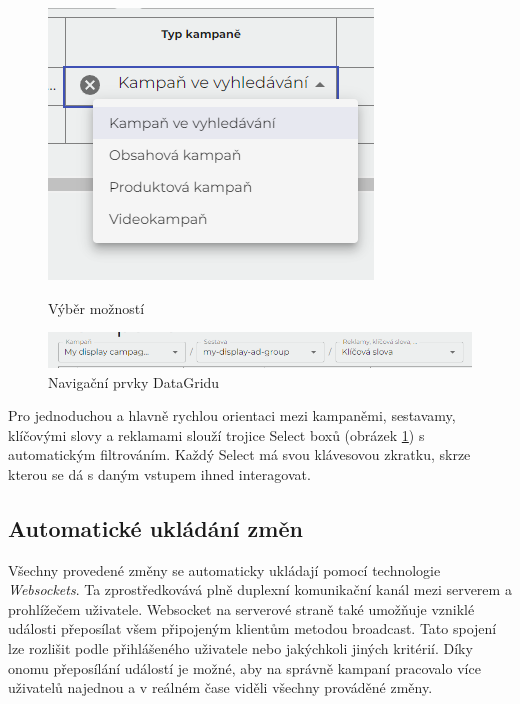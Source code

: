 \begin{figure}
    \begin{minipage}{.5\textwidth}
        \centering
        \includegraphics[width=.7\textwidth]{Figures/ui/cell-choices.png}
        \caption{Výběr možností}        
        \label{fig:cell-choices}
    \end{minipage}
    \begin{minipage}{.5\textwidth}
        \centering
        \includegraphics[width=1\textwidth]{Figures/ui/datagrid-controls.png}
        \caption{Navigační prvky DataGridu}        
        \label{fig:datagrid-controls}
    \end{minipage}
\end{figure}

Pro jednoduchou a hlavně rychlou orientaci mezi kampaněmi, sestavamy, klíčovými slovy a reklamami slouží trojice Select boxů (obrázek \ref{fig:datagrid-controls}) s automatickým filtrováním.
Každý Select má svou klávesovou zkratku, skrze kterou se dá s daným vstupem ihned interagovat. 



\subsection{Automatické ukládání změn}
Všechny provedené změny se automaticky ukládají pomocí technologie \emph{Websockets}. Ta zprostředkovává plně duplexní komunikační kanál mezi serverem a prohlížečem uživatele.
Websocket na serverové straně také umožňuje vzniklé události přeposílat všem připojeným klientům metodou broadcast. Tato spojení lze rozlišit podle přihlášeného uživatele nebo jakýchkoli jiných
kritérií. Díky onomu přeposílání událostí je možné, aby na správně kampaní pracovalo více uživatelů najednou a v reálném čase viděli všechny prováděné změny.

